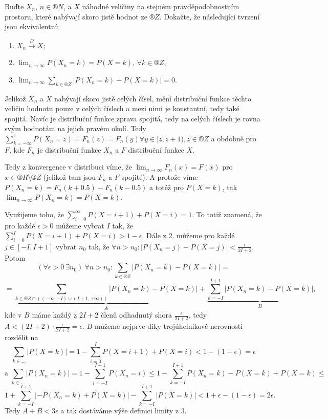 \documentclass[12pt]{article}					%
\begin{document}
\pagebreak
\begin{priklad}
	Buďte $X_n$, $n \in ®N$, a $X$ náhodné veličiny na stejném pravděpodobnostním prostoru, které nabývají skoro jistě hodnot ze $®Z$. Dokažte, že následující tvrzení jsou ekvivalentní:
	\vspace{-1em}

	\begin{enumerate}
		\item $X_n \overset{D} \rightarrow X$;
		\item $\lim_{n \rightarrow ∞} P(X_n = k) = P(X = k)$, $\forall k \in ®Z$,
		\item $\lim_{n \rightarrow ∞} \sum_{k \in ®Z} |P(X_n = k) - P(X = k)| = 0$.
	\end{enumerate}

	\begin{dukazin}[„1. $\implies$ 2.“]
		Jelikož $X_n$ a $X$ nabývají skoro jistě celých čísel, mění distribuční funkce těchto veličin hodnotu pouze v celých číslech a mezi nimi je konstantní, tedy také spojitá. Navíc je distribuční funkce zprava spojitá, tedy na celých číslech je rovna svým hodnotám na jejich pravém okolí. Tedy $\sum_{k = -∞}^z P(X_n = z) = F_n(z) = F_n(y) \forall y \in [z, z+1), z \in ®Z$ a obdobně pro $F$, kde $F_n$ je distribuční funkce $X_n$ a $F$ distribuční funkce $X$.

		Tedy z konvergence v distribuci víme, že $\lim_{n \rightarrow ∞} F_n(x) = F(x)$ pro $x \in ®R \setminus ®Z$ (jelikož tam jsou $F_n$ a $F$ spojité). A protože víme $P(X_n = k) = F_n(k + 0.5) - F_n(k - 0.5)$ a totéž pro $P(X = k)$, tak $\lim_{n \rightarrow ∞} P(X_n = k) = P(X = k)$.
	\end{dukazin}

	\begin{dukazin}[„2. $\implies$ 3.“]
		Využijeme toho, že $\sum_{i=0}^∞ P(X = i + 1) + P(X = i) = 1$. To totiž znamená, že pro každé $\epsilon > 0$ můžeme vybrat $I$ tak, že $\sum_{i=0}^I P(X = i + 1) + P(X = i) > 1 - \epsilon$. Dále z 2. můžeme pro každé $j \in [-I, I+1]$ vybrat $n_0$ tak, že $\forall n > n_0: |P(X_n = j) - P(X = j)| < \frac{\epsilon}{2I + 2}$. Potom
		$$ (\forall \epsilon > 0\ \exists n_0)\ \forall n > n_0: \sum_{k \in ®Z}|P(X_n = k) - P(X = k)| = $$
		$$ = \underbrace{\sum_{k \in ®Z \cap ((-∞, -I) \cup (I + 1, +∞))} |P(X_n = k) - P(X = k)|}_A + \underbrace{\sum_{k = -I}^{I + 1} |P(X_n = k) - P(X = k)|}_B, $$
		kde v $B$ máme každý z $2I + 2$ členů odhadnutý shora $\frac{\epsilon}{2I + 2}$, tedy $A < (2I + 2)·\frac{\epsilon}{2I + 2} = \epsilon$. $B$ můžeme nejprve díky trojúhelníkové nerovnosti rozdělit na
		$$ \sum_{k \in …} |P(X = k)| = 1 - \sum_{i=0}^I P(X = i + 1) + P(X = i) < 1 - (1 - \epsilon) = \epsilon $$
		$$ \text{a } \sum_{k \in …} |P(X_n = k)| = 1 - \sum_{i=-I}^{I + 1} P(X_n = i) ≤ 1 - \sum_{k = -I}^{I + 1} P(X_n = k) - P(X = k) + P(X = k) ≤ $$
		$$ 1 + \sum_{k = -I}^{I + 1} |-P(X_n = k) + P(X = k)| - \sum_{k = -I}^{I+1} |P(X = k)| < 1 + \epsilon - (1 - \epsilon) = 2\epsilon. $$
		Tedy $A + B < 3 \epsilon$ a tak dostáváme výše definici limity z 3.
	\end{dukazin}


\end{priklad}
\end{document}
